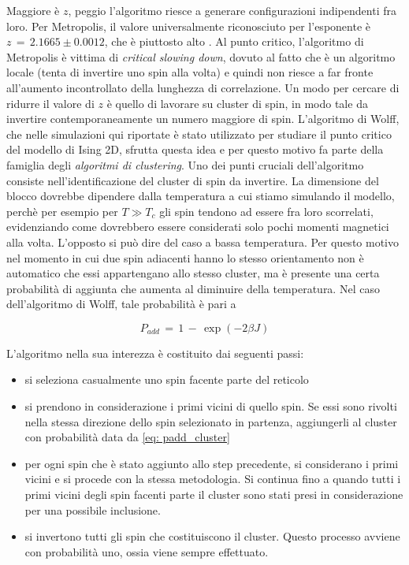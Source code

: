 Maggiore è $z$, peggio l'algoritmo riesce a generare configurazioni indipendenti fra loro. Per Metropolis, il valore universalmente 
riconosciuto per l'esponente è $z\,=\,2.1665 \pm 0.0012$, che è piuttosto alto \cite{MCM}. Al punto critico, l'algoritmo di Metropolis è vittima 
di \textit{critical slowing down}, dovuto al fatto che è un algoritmo locale (tenta di invertire uno spin alla volta) e quindi non 
riesce a far fronte all'aumento incontrollato della lunghezza di correlazione. Un modo per cercare di ridurre il valore di $z$ è quello 
di lavorare su cluster di spin, in modo tale da invertire contemporaneamente un numero maggiore di spin. L'algoritmo di Wolff, che nelle 
simulazioni qui riportate è stato utilizzato per studiare il punto critico del modello di Ising 2D, sfrutta questa idea e per questo 
motivo fa parte della famiglia degli \textit{algoritmi di clustering}. Uno dei punti cruciali dell'algoritmo consiste nell'identificazione 
del cluster di spin da invertire. La dimensione del blocco dovrebbe dipendere dalla temperatura a cui stiamo simulando il modello, perchè 
per esempio per $T \gg T_c$ gli spin tendono ad essere fra loro scorrelati, evidenziando come dovrebbero essere considerati solo pochi 
momenti magnetici alla volta. L'opposto si può dire del caso a bassa temperatura. Per questo motivo nel momento in cui due spin adiacenti 
hanno lo stesso orientamento non è automatico che essi appartengano allo stesso cluster, ma è presente una certa probabilità di aggiunta 
che aumenta al diminuire della temperatura. Nel caso dell'algoritmo di Wolff, tale probabilità è pari a 

\begin{equation}
    P_{add}\,=\,1\,-\,\exp{\left(-2\beta J\right)}
    \label{eq: padd_cluster}
\end{equation}

L'algoritmo nella sua interezza è costituito dai seguenti passi:

\begin{itemize}[label=$\diamond$] 
    \item si seleziona casualmente uno spin facente parte del reticolo
    \item si prendono in considerazione i primi vicini di quello spin. Se essi sono rivolti nella stessa direzione dello spin 
    selezionato in partenza, aggiungerli al cluster con probabilità data da \eqref{eq: padd_cluster}
    \item per ogni spin che è stato aggiunto allo step precedente, si considerano i primi vicini e si procede con la stessa metodologia. 
    Si continua fino a quando tutti i primi vicini degli spin facenti parte il cluster sono stati presi in considerazione per una possibile 
    inclusione.
    \item si invertono tutti gli spin che costituiscono il cluster. Questo processo avviene con probabilità uno, ossia viene sempre effettuato.
\end{itemize}

